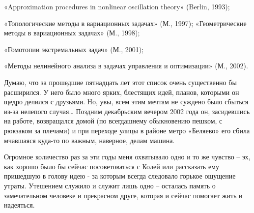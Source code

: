 «Approximation procedures in nonlinear oscillation theory» (Berlin, 1993);

«Топологические методы в вариационных задачах» (М., 1997); «Геометрические методы в вариационных задачах» (М., 1998);

«Гомотопии экстремальных задач» (М., 2001);

«Методы нелинейного анализа в задачах управления и оптимизации» (М., 2002).

	Думаю, что за прошедшие пятнадцать лет этот список очень существенно бы расширился. У него было много ярких, блестящих идей, планов, которыми он щедро делился с друзьями. Но, увы, всем  этим мечтам не суждено было сбыться из-за нелепого случая… Поздним декабрьским вечером 2002 года он, засидевшись на работе, возвращался домой (по всегдашнему обыкновению пешком, с рюкзаком за плечами) и при переходе улицы в районе метро «Беляево» его сбила мчавшаяся куда-то по важным, наверное, делам машина.

Огромное количество раз за эти годы меня охватывало одно и то же чувство – эх, как хорошо было бы сейчас посоветоваться с Колей или рассказать ему пришедшую в голову идею - за которым всегда следовало горькое ощущение утраты. Утешением служило и служит лишь одно – осталась память о замечательном человеке и прекрасном друге, которая и сейчас помогает жить и надеяться.
